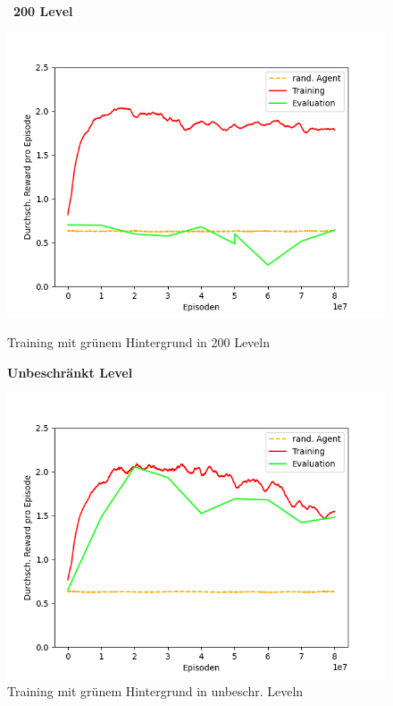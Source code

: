 \begin{figure}[htp!]
   \centering
   \captionsetup{width=0.45\linewidth} 
    \begin{minipage}{0.48\linewidth}
        \centering\
        \textbf{200 Level}\par\medskip
        \includegraphics[scale=0.5]{abb/_graphen/green_80Mio_200lvl_15act_Training_evalAsTraining}
        \caption{Training mit grünem Hintergrund in 200 Leveln}
        \label{fig:grph_green_80Mio_200lvl_15act_Training_evalAsTraining_}
    \end{minipage}
    \centering
    \begin{minipage}{0.48\linewidth}
        \centering
        \textbf{Unbeschränkt Level}\par\medskip
        \includegraphics[scale=0.5]{abb/_graphen/green_80Mio_inflvl_15act_Training_evalAsTraining} 
        \caption{Training mit grünem Hintergrund in unbeschr. Leveln}
        \label{fig:grph_green_80Mio_inflvl_15act_Training_evalAsTraining_}
    \end{minipage}
\end{figure}

